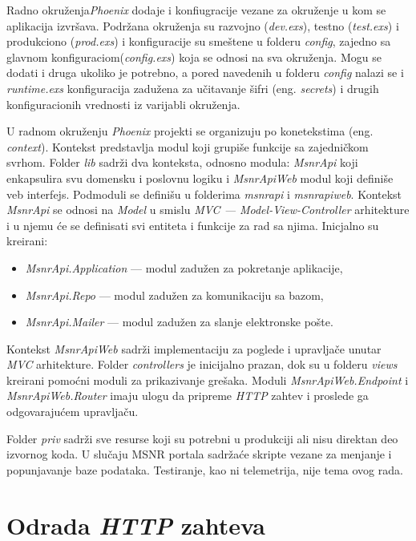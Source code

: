 \documentclass[12pt,oneside]{memoir}
\begin{document}
Radno okruženja\emph{Phoenix} dodaje i konfiugracije vezane za okruženje u kom se aplikacija izvršava. 
Podržana okruženja su razvojno (\emph{dev.exs}), testno (\emph{test.exs}) i produkciono (\emph{prod.exs}) i konfiguracije su smeštene u folderu \emph{config},
zajedno sa glavnom konfiguraciom(\emph{config.exs}) koja se odnosi na sva okruženja. Mogu se dodati i druga ukoliko je potrebno, a pored navedenih
u folderu \emph{config} nalazi se i \emph{runtime.exs} konfiguracija zadužena za učitavanje šifri (eng. \emph{secrets}) i drugih konfiguracionih vrednosti
iz varijabli okruženja.

U radnom okruženju \emph{Phoenix} projekti se organizuju po konetekstima (eng. \emph{context}). Kontekst predstavlja modul koji grupiše funkcije sa
zajedničkom svrhom. Folder \emph{lib} sadrži dva konteksta, odnosno modula: \emph{MsnrApi} koji enkapsulira svu domensku i
poslovnu logiku i \emph{MsnrApiWeb} modul koji definiše veb interfejs. Podmoduli se definišu u folderima \emph{msnr{\textunderscore}api}
i \emph{msnr{\textunderscore}api{\textunderscore}web}. 
Kontekst \emph{MsnrApi} se odnosi na \emph{Model} u smislu \emph{MVC --- Model-View-Controller} arhitekture i u njemu će se definisati svi entiteta i
funkcije za rad sa njima. Inicjalno su kreirani:
\begin{itemize}
  \item \emph{MsnrApi.Application} --- modul zadužen za pokretanje aplikacije,
  \item \emph{MsnrApi.Repo} --- modul zadužen za komunikaciju sa bazom,
  \item \emph{MsnrApi.Mailer} --- modul zadužen za slanje elektronske pošte.
\end{itemize}
Kontekst \emph{MsnrApiWeb} sadrži implementaciju za poglede i upravljače unutar \emph{MVC} arhitekture.
Folder \emph{controllers} je inicijalno prazan, dok su u folderu \emph{views} kreirani pomoćni moduli za prikazivanje grešaka.
Moduli \emph{MsnrApiWeb.Endpoint} i \emph{MsnrApiWeb.Router} imaju ulogu da pripreme \emph{HTTP} zahtev i proslede ga odgovarajućem
upravljaču.

Folder \emph{priv} sadrži sve resurse koji su potrebni u produkciji ali nisu direktan deo izvornog koda. U slučaju MSNR portala
sadržaće skripte vezane za menjanje i popunjavanje baze podataka. Testiranje, kao ni telemetrija, nije tema ovog rada.

\section{Odrada \emph{HTTP} zahteva}
\end{document}
